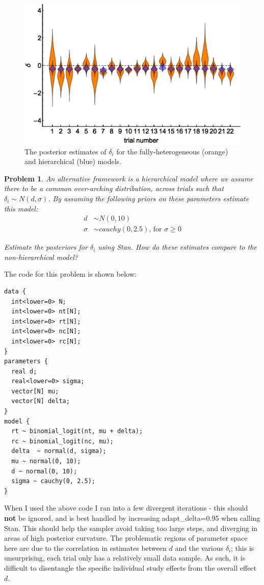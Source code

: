 \documentclass{article}
\newtheorem{problem}{Problem}[section]
\begin{document}
\begin{figure}[ht]
	\centerline{\includegraphics[width=1.5\textwidth]{figures/prob5_betaBlockerDelta.pdf}}
	\caption{The posterior estimates of $\delta_i$ for the fully-heterogeneous (orange) and hierarchical (blue) models.}\label{fig:prob5_delta}
\end{figure}

\begin{problem}
	An alternative framework is a hierarchical model where we assume there to be a common over-arching distribution, across trials such that $\delta_i\sim N(d,\sigma)$. By assuming the following priors on these parameters estimate this model:
	\begin{align}
	d&\sim N(0,10)\\
	\sigma &\sim cauchy(0,2.5) \text{, for }\sigma\geq 0
	\end{align}
	
	Estimate the posteriors for $\delta_i$ using Stan. How do these estimates compare to the non-hierarchical model?
\end{problem}

The code for this problem is shown below:

\begin{verbatim}
data {
  int<lower=0> N; 
  int<lower=0> nt[N]; 
  int<lower=0> rt[N]; 
  int<lower=0> nc[N]; 
  int<lower=0> rc[N]; 
} 
parameters {
  real d;
  real<lower=0> sigma; 
  vector[N] mu;
  vector[N] delta;
} 
model {
  rt ~ binomial_logit(nt, mu + delta);
  rc ~ binomial_logit(nc, mu);
  delta  ~ normal(d, sigma); 
  mu ~ normal(0, 10);
  d ~ normal(0, 10); 
  sigma ~ cauchy(0, 2.5);
}
\end{verbatim}

When I used the above code I ran into a few divergent iterations - this should \textbf{not} be ignored, and is best handled by increasing adapt\_delta=0.95 when calling Stan. This should help the sampler avoid taking too large steps, and diverging in areas of high posterior curvature.  The problematic regions of parameter space here are due to the correlation in estimates between $d$ and the various $\delta_i$; this is unsurprising, each trial only has a relatively small data sample. As such, it is difficult to disentangle the specific individual study effects from the overall effect $d$.
\end{document}

